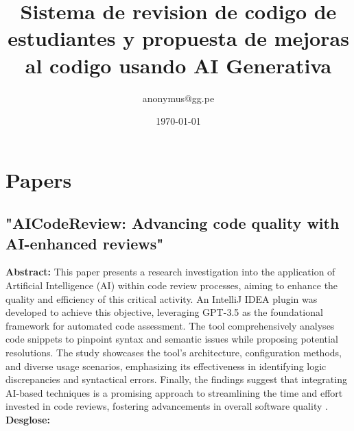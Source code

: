 \documentclass{article}
\title{Sistema de revision de codigo de estudiantes y propuesta de mejoras al codigo usando AI Generativa}
\author{anonymus@gg.pe}
\date{\today}
\begin{document}
\maketitle

\newpage
\tableofcontents
\newpage




\section{Papers}

\subsection{"AICodeReview: Advancing code quality with AI-enhanced reviews" \cite{ALMEIDA2024101677}}

\textbf{Abstract:} This paper presents a research investigation into the application of Artificial Intelligence (AI) within code review processes, aiming to enhance the quality and efficiency of this critical activity. An IntelliJ IDEA plugin was developed to achieve this objective, leveraging GPT-3.5 as the foundational framework for automated code assessment. The tool comprehensively analyses code snippets to pinpoint syntax and semantic issues while proposing potential resolutions. The study showcases the tool's architecture, configuration methods, and diverse usage scenarios, emphasizing its effectiveness in identifying logic discrepancies and syntactical errors. Finally, the findings suggest that integrating AI-based techniques is a promising approach to streamlining the time and effort invested in code reviews, fostering advancements in overall software quality \cite{ALMEIDA2024101677}. \\

\textbf{Desglose:}
\end{document}
